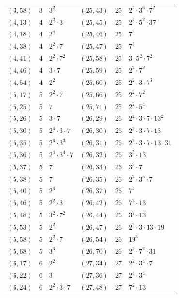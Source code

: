 \documentclass[11pt]{article}
\begin{document}
\begin{longtable}{@{}lrl@{\qquad}lrl@{}}
$(3,58)$ & 3 & $3^{2}$ & $(25,43)$ & 25 & $2^{2}\cdot 3^{6}\cdot 7^{2}$\\
$(4,13)$ & 4 & $2^{2}\cdot 3$ & $(25,45)$ & 25 & $2^{4}\cdot 5^{2}\cdot 37$\\
$(4,18)$ & 4 & $2^{4}$ & $(25,46)$ & 25 & $7^{3}$\\
$(4,38)$ & 4 & $2^{2}\cdot 7$ & $(25,47)$ & 25 & $7^{3}$\\
$(4,41)$ & 4 & $2^{2}\cdot 7^{2}$ & $(25,58)$ & 25 & $3\cdot 5^{2}\cdot 7^{2}$\\
$(4,46)$ & 4 & $3\cdot 7$ & $(25,59)$ & 25 & $2^{2}\cdot 7^{2}$\\
$(4,54)$ & 4 & $2^{2}$ & $(25,60)$ & 25 & $2^{2}\cdot 3\cdot 7^{3}$\\
$(5,17)$ & 5 & $2^{2}\cdot 7$ & $(25,66)$ & 25 & $2^{2}\cdot 7^{2}$\\
$(5,25)$ & 5 & $7$ & $(25,71)$ & 25 & $2^{2}\cdot 5^{4}$\\
$(5,26)$ & 5 & $3\cdot 7$ & $(26,29)$ & 26 & $2^{2}\cdot 3\cdot 7\cdot 13^{2}$\\
$(5,30)$ & 5 & $2^{4}\cdot 3\cdot 7$ & $(26,30)$ & 26 & $2^{2}\cdot 3\cdot 7\cdot 13$\\
$(5,35)$ & 5 & $2^{6}\cdot 3^{3}$ & $(26,31)$ & 26 & $2^{2}\cdot 3\cdot 7\cdot 13\cdot 31$\\
$(5,36)$ & 5 & $2^{4}\cdot 3^{4}\cdot 7$ & $(26,32)$ & 26 & $3^{5}\cdot 13$\\
$(5,37)$ & 5 & $7$ & $(26,33)$ & 26 & $3^{2}\cdot 7$\\
$(5,38)$ & 5 & $7$ & $(26,35)$ & 26 & $2^{2}\cdot 3^{5}\cdot 7$\\
$(5,40)$ & 5 & $2^{6}$ & $(26,37)$ & 26 & $7^{4}$\\
$(5,46)$ & 5 & $2^{2}\cdot 3$ & $(26,42)$ & 26 & $7^{2}\cdot 13$\\
$(5,48)$ & 5 & $3^{2}\cdot 7^{2}$ & $(26,44)$ & 26 & $3^{7}\cdot 13$\\
$(5,53)$ & 5 & $2^{2}$ & $(26,47)$ & 26 & $2^{2}\cdot 3\cdot 13\cdot 19$\\
$(5,58)$ & 5 & $2^{2}\cdot 7$ & $(26,54)$ & 26 & $19^{3}$\\
$(5,68)$ & 5 & $3^{3}$ & $(26,70)$ & 26 & $2^{2}\cdot 7^{2}\cdot 31$\\
$(6,17)$ & 6 & $2^{2}$ & $(27,34)$ & 27 & $2^{2}\cdot 3^{4}\cdot 7$\\
$(6,22)$ & 6 & $3$ & $(27,36)$ & 27 & $2^{4}\cdot 3^{4}$\\
$(6,24)$ & 6 & $2^{2}\cdot 3\cdot 7$ & $(27,48)$ & 27 & $7^{2}\cdot 13$\\

\end{longtable}
\end{document}
